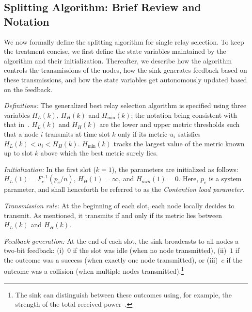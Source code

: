 \documentclass[12pt,draftcls,peerreview, onecolumn]{IEEEtran}
\begin{document}
\subsection{Splitting Algorithm: Brief Review and Notation}

We now formally define the splitting algorithm for single relay
selection. To keep the treatment concise, we first define the state
variables maintained by the algorithm and their initialization.
Thereafter, we describe how the algorithm controls the transmissions
of the nodes, how the sink generates feedback based on these
transmissions, and how the state variables get autonomously updated
based on the feedback.

{\em Definitions:} The generalized best relay selection algorithm is
specified using three variables $H_L(k)$, $H_H(k)$ and $H_{\min}(k)$;
the notation being consistent with that in~\cite{qin_infocomm_2004}.
$H_L(k)$ and $H_H(k)$ are the lower and upper metric thresholds such
that a node $i$ transmits at time slot $k$ only if its metric $u_i$
satisfies $H_L(k) < u_i < H_H(k)$.  $H_{\min}(k)$ tracks the largest
value of the metric known up to slot $k$ above which the best metric
surely lies.


{\em Initialization:} In the first slot ($k = 1$), the parameters are
initialized as follows: $H_L(1) = F_{c}^{-1}(p_e/n)$, $H_H(1) =
\infty$, and $H_{min}(1) = 0$. Here, $p_e$ is a system parameter, and
shall henceforth be referred to as the {\em Contention load parameter}.

{\em Transmission rule:} At the beginning of each slot, each node
locally decides to transmit. As mentioned, it transmits if and only if
its metric lies between $H_L(k)$ and $H_H(k)$.

{\em Feedback generation:} At the end of each slot, the sink
broadcasts to all nodes a two-bit feedback: (i)~$0$ if the slot was idle (when no node
transmitted), (ii)~$1$ if the outcome was a success (when exactly one
node transmitted), or (iii)~$e$ if the outcome was a collision (when
multiple nodes transmitted).\footnote{The sink can distinguish between
  these outcomes using, for example, the strength of the total
  received power~\cite{yim_2008_ICC}.}
\end{document}
